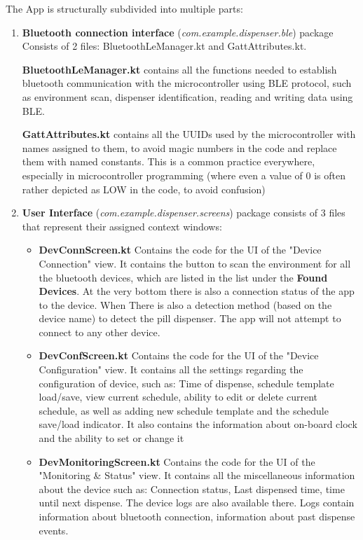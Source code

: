 The App is structurally subdivided into multiple parts: 
\begin{enumerate}
	\item \textbf{Bluetooth connection interface} (\textit{com.example.dispenser.ble}) package Consists of 2 files: BluetoothLeManager.kt and GattAttributes.kt. 
	
	\textbf{BluetoothLeManager.kt} contains all the functions needed to establish bluetooth communication with the microcontroller using \ac{BLE} protocol, such as environment scan, dispenser identification, reading and writing data using \ac{BLE}.
	
	\textbf{GattAttributes.kt} contains all the \ac{UUID}s used by the microcontroller with names assigned to them, to avoid magic numbers in the code and replace them with named constants. This is a common practice everywhere, especially in microcontroller programming (where even a value of 0 is often rather depicted as LOW in the code, to avoid confusion)
	\item \textbf{User Interface} (\textit{com.example.dispenser.screens}) package consists of 3 files that represent their assigned context windows:
	\begin{itemize}
		\item \textbf{DevConnScreen.kt} Contains the code for the UI of the "Device Connection" view. It contains the button to scan the environment for all the bluetooth devices, which are listed in the list under the \textbf{Found Devices}. At the very bottom there is also a connection status of the app to the device. When There is also a detection method (based on the device name) to detect the pill dispenser. The app will not attempt to connect to any other device.

		\item \textbf{DevConfScreen.kt} Contains the code for the UI of the "Device Configuration" view. It contains all the settings regarding the configuration of device, such as: Time of dispense, schedule template load/save, view current schedule, ability to edit or delete current schedule, as well as adding new schedule template and the schedule save/load indicator. It also contains the information about on-board clock and the ability to set or change it
		
		\item \textbf{DevMonitoringScreen.kt} Contains the code for the UI of the "Monitoring \& Status" view. It contains all the miscellaneous information about the device such as: Connection status, Last dispensed time, time until next dispense. The device logs are also available there. Logs contain information about bluetooth connection, information about past dispense events.
		
	\end{itemize}

\end{enumerate}

